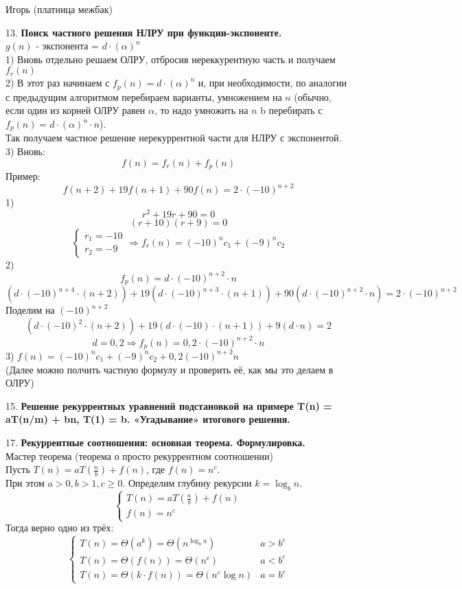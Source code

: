 \documentclass[12pt]{article}
\begin{document}
\begin{center}
    Игорь (платница межбак)
\end{center}

13. \textbf{Поиск частного решения НЛРУ при функции-экспоненте.}\\
$g(n)$ - экспонента = $d \cdot (\alpha)^n$\\
1) Вновь отдельно решаем ОЛРУ, отбросив нереккурентную часть и получаем $f_r(n)$\\
2) В этот раз начинаем с $f_p(n) = d \cdot (\alpha)^n$ и, при необходимости, по аналогии с предыдущим алгоритмом перебираем варианты, умножением на $n$ (обычно, если один из корней ОЛРУ равен $\alpha$, то надо умножить на $n$ b перебирать с $f_p(n) = d \cdot (\alpha)^n
\cdot n$).\\
Так получаем частное решение нерекуррентной части для НЛРУ с экспонентой.\\
3) Вновь:
\[f(n) = f_r(n) + f_p(n)\]
Пример:\\
\[f(n+2) + 19f(n+1) + 90f(n) = 2 \cdot (-10)^{n+2}\]
1) 
\[r^2 + 19r + 90 = 0\]
\[(r + 10)(r + 9) = 0\]
\[
\begin{cases}
    r_1 = -10\\
    r_2 = -9    
\end{cases} \Rightarrow f_r(n) = (-10)^nc_1 + (-9)^nc_2
\]
2) 
\[f_p(n) = d \cdot (-10)^{n+2} \cdot n\]
\[
(d \cdot (-10)^{n+4} \cdot (n + 2)) + 19(d \cdot (-10)^{n+3} \cdot (n + 1)) + 90(d \cdot (-10)^{n+2} \cdot n) = 2 \cdot (-10)^{n+2}
\]
Поделим на $(-10)^{n+2}$\\
\[
(d \cdot (-10)^{2} \cdot (n + 2)) + 19(d \cdot (-10) \cdot (n + 1)) + 9(d \cdot n) = 2
\]
\[
d = 0,2 \Rightarrow f_p(n) = 0,2 \cdot (-10)^{n+2} \cdot n
\]
3) $f(n) = (-10)^nc_1 + (-9)^nc_2 + 0,2(-10)^{n+2}n$\\
(Далее можно полчить частную формулу и проверить её, как мы это делаем в ОЛРУ)

15. \textbf{Решение рекуррентных уравнений подстановкой на примере T(n) = aT(n/m) + bn, T(1) = b. «Угадывание» итогового решения.}

17. \textbf{Рекуррентные соотношения: основная теорема. Формулировка.}\\
Мастер теорема (теорема о просто рекуррентном соотношении)\\
Пусть $T(n) = aT(\frac{n}{b}) + f(n)$, где $f(n) = n^c$.\\ При этом  $a > 0, b > 1, c \geq 0$. Определим глубину рекурсии $k = \log_{b}n$. \\
\[
\begin{cases}
T(n) = aT(\frac{n}{b}) + f(n)\\
f(n) = n^c
\end{cases}
\]
Тогда верно одно из трёх:
\[
\left\{
\begin{array}{ll}
   T(n) = \Theta(a^k) = \Theta(n^{\log_ba}) & a > b^c\\
   T(n) = \Theta(f(n)) = \Theta(n^c) & a < b^c
   \\
   T(n) = \Theta(k \cdot f(n)) = \Theta(n^c\log n) &  a = b^c
 \end{array}
\right.
\]
\end{document}
